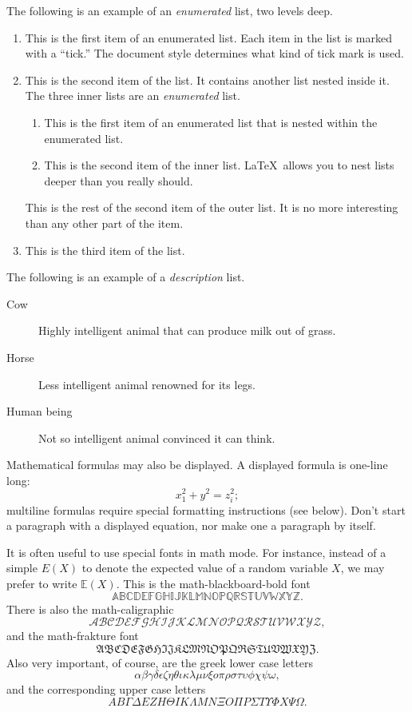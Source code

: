 \documentclass[aodsor,preprint]{imsart}
\numberwithin{equation}{section}
\theoremstyle{plain}
\begin{document}
The following is an example of an {\em enumerated} list, two levels deep.
\begin{enumerate}
\item  This is the first item of an enumerated list.  Each item
      in the list is marked with a ``tick.''  The document
      style determines what kind of tick mark is used.
\item  This is the second item of the list.  It contains another
      list nested inside it.  The three inner lists are an {\em enumerated}
      list.
    \begin{enumerate}
       \item This is the first item of an enumerated list that
            is nested within the enumerated list.
          \item This is the second item of the inner list.  \LaTeX\
            allows you to nest lists deeper than you really should.
      \end{enumerate}
      This is the rest of the second item of the outer list.  It
      is no more interesting than any other part of the item.
   \item  This is the third item of the list.
\end{enumerate}


The following is an example of a {\em description} list.
\begin{description}
\item[Cow] Highly intelligent animal that can produce milk out of grass.
\item[Horse] Less intelligent animal renowned for its legs.
\item[Human being] Not so intelligent animal convinced it can think.
\end{description}



Mathematical formulas may also be displayed.  A displayed formula is
one-line long:
$$
x_1^2 + y^{2} = z_{i}^{2};
$$
multiline formulas require special formatting
instructions (see below).
Don't start a paragraph with a displayed equation, nor make
one a paragraph by itself.

It is often useful to use special fonts in math mode. For instance, instead of a simple $E(X)$ to denote the expected value of a random variable $X$, we may prefer to write $\mathbb E(X)$. This is the math-blackboard-bold font $$\mathbb{ABCDEFGHIJKLMNOPQRSTUVWXYZ}.$$ There is also the math-caligraphic $$\mathcal{ABCDEFGHIJKLMNOPQRSTUVWXYZ},$$
and the math-frakture font
$$\mathfrak{ABCDEFGHIJKLMNOPQRSTUVWXYZ}.$$
Also very important, of course, are the greek lower case letters
$$
\alpha\beta\gamma\delta\epsilon\zeta\eta\theta\iota\kappa\lambda\mu\nu\xi o\pi\rho\sigma\tau\upsilon\phi\chi\psi\omega,
$$
and the corresponding upper case letters
$$
AB\Gamma\Delta EZH\Theta IK\Lambda MN\Xi O\Pi P\Sigma T\Upsilon\Phi X\Psi\Omega.
$$
\end{document}

